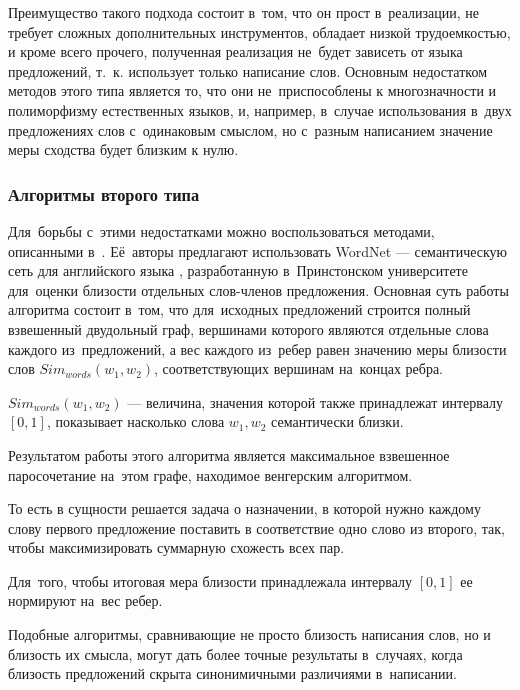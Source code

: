Преимущество такого подхода состоит в~том, что он прост в~реализации, не требует
сложных дополнительных инструментов, обладает низкой трудоемкостью, и кроме всего прочего,
 полученная реализация не~будет зависеть от языка предложений, 
т.~к. использует только написание слов.
Основным недостатком методов этого типа является то, что они  не~приспособлены к многозначности и полиморфизму естественных языков, 
и, например, в~случае  использования в~двух предложениях слов с~одинаковым смыслом, но с~разным написанием 
значение меры сходства будет близким к нулю.

\subsubsection{Алгоритмы второго типа}
\label{sec:second_type_algorithm}
Для~борьбы с~этими недостатками можно воспользоваться методами, описанными в~\cite{wordnetSim}.
Её~авторы предлагают использовать WordNet --- семантическую сеть для английского языка \cite{wordnet}, 
разработанную в~Принстонском университете для~оценки близости отдельных слов-членов предложения.
Основная суть работы алгоритма состоит в~том, 
что для~исходных предложений строится полный взвешенный двудольный граф, 
вершинами которого являются отдельные слова каждого из~предложений, 
а вес каждого из~ребер равен значению меры близости слов $Sim_{words}(w_1, w_2)$,
соответствующих вершинам на~концах ребра. 

$Sim_{words}(w_1, w_2)$ --- величина, значения которой также принадлежат интервалу $[0,1]$,
показывает насколько слова $w_1,w_2$ семантически близки.

Результатом работы этого алгоритма является максимальное взвешенное паросочетание на~этом графе, 
находимое венгерским алгоритмом\cite{hungarian}.

То есть в сущности решается задача о назначении\cite{oper_research}, в которой
нужно каждому слову первого предложение поставить в соответствие одно слово из второго,
так, чтобы максимизировать суммарную схожесть всех пар.

Для~того, чтобы итоговая мера близости принадлежала интервалу $[0,1]$ ее нормируют на~вес ребер.

Подобные алгоритмы, сравнивающие не просто близость написания слов, 
но и близость их смысла, могут дать более точные результаты в~случаях, 
когда близость предложений скрыта синонимичными различиями в~написании.

